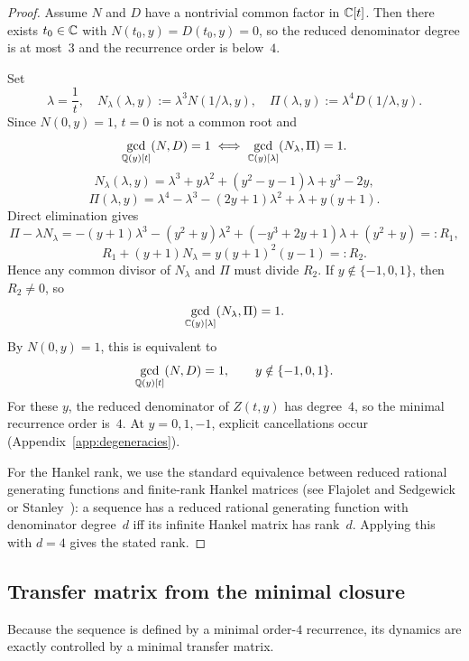 \begin{proof}
Assume $N$ and $D$ have a nontrivial common factor in $\mathbb{C}[t]$.
Then there exists $t_0\in\mathbb{C}$ with $N(t_0,y)=D(t_0,y)=0$, so the reduced denominator degree is at most~$3$ and the recurrence order is below~$4$.

Set
\[
\lambda=\frac1t,\quad
N_\lambda(\lambda,y):=\lambda^3N(1/\lambda,y),\quad
\Pi(\lambda,y):=\lambda^4D(1/\lambda,y).
\]
Since \(N(0,y)=1\), \(t=0\) is not a common root and
\[
\gcd_{\mathbb{Q}(y)[t]}(N,D)=1\iff \gcd_{\mathbb{C}(y)[\lambda]}(N_\lambda,\Pi)=1.
\]
\[
N_\lambda(\lambda,y)=\lambda^3+y\lambda^2+(y^2-y-1)\lambda+y^3-2y,
\]
\[
\Pi(\lambda,y)=\lambda^4-\lambda^3-(2y+1)\lambda^2+\lambda+y(y+1).
\]
Direct elimination gives
\[
\Pi-\lambda N_\lambda=-(y+1)\lambda^3-(y^2+y)\lambda^2+(-y^3+2y+1)\lambda+(y^2+y)=:R_1,
\]
\[
R_1+(y+1)N_\lambda=y(y+1)^2(y-1)=:R_2.
\]
Hence any common divisor of \(N_\lambda\) and \(\Pi\) must divide \(R_2\).
If \(y\notin\{-1,0,1\}\), then \(R_2\neq0\), so
\[
\gcd_{\mathbb{C}(y)[\lambda]}(N_\lambda,\Pi)=1.
\]
By \(N(0,y)=1\), this is equivalent to
\[
\gcd_{\mathbb{Q}(y)[t]}(N,D)=1,\qquad y\notin\{-1,0,1\}.
\]
For these \(y\), the reduced denominator of \(Z(t,y)\) has degree~$4$, so the minimal recurrence order is~$4$.
At \(y=0,1,-1\), explicit cancellations occur (Appendix~\ref{app:degeneracies}).

For the Hankel rank, we use the standard equivalence between reduced rational generating functions and finite-rank Hankel matrices (see Flajolet and Sedgewick~\cite[Theorem~IV.9]{FlajoletSedgewick2009} or Stanley~\cite[Proposition~4.2.3]{Stanley1999}): a sequence has a reduced rational generating function with denominator degree~$d$ iff its infinite Hankel matrix has rank~$d$.
Applying this with \(d=4\) gives the stated rank.
\end{proof}

\subsection{Transfer matrix from the minimal closure}

Because the sequence is defined by a minimal order-$4$ recurrence, its dynamics are exactly controlled by a minimal transfer matrix.

